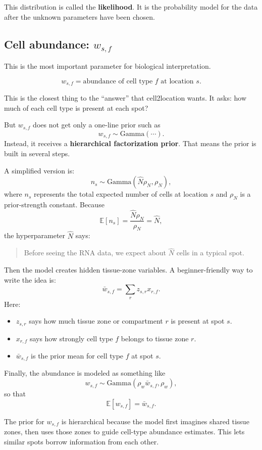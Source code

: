 \documentclass[11pt]{article}
\newcommand{\E}{\mathbb{E}}
\newcommand{\term}[1]{\textbf{#1}}
\begin{document}
This distribution is called the \term{likelihood}. It is the probability model for the data after the unknown parameters have been chosen.

\subsection{Cell abundance: $w_{s,f}$}

This is the most important parameter for biological interpretation.

\[
w_{s,f}=\text{abundance of cell type }f\text{ at location }s.
\]

This is the closest thing to the ``answer'' that cell2location wants. It asks: how much of each cell type is present at each spot?

But $w_{s,f}$ does not get only a one-line prior such as
\[
w_{s,f}\sim \mathrm{Gamma}(\cdots).
\]
Instead, it receives a \term{hierarchical factorization prior}. That means the prior is built in several steps.

A simplified version is:
\[
n_s\sim \mathrm{Gamma}(\hat N\rho_N,\rho_N),
\]
where $n_s$ represents the total expected number of cells at location $s$ and $\rho_N$ is a prior-strength constant. Because
\[
\E[n_s]=\frac{\hat N\rho_N}{\rho_N}=\hat N,
\]
the hyperparameter $\hat N$ says:

\begin{quote}
Before seeing the RNA data, we expect about $\hat N$ cells in a typical spot.
\end{quote}

Then the model creates hidden tissue-zone variables. A beginner-friendly way to write the idea is:
\[
\bar w_{s,f}=\sum_r z_{s,r}x_{r,f}.
\]
Here:
\begin{itemize}
  \item $z_{s,r}$ says how much tissue zone or compartment $r$ is present at spot $s$.
  \item $x_{r,f}$ says how strongly cell type $f$ belongs to tissue zone $r$.
  \item $\bar w_{s,f}$ is the prior mean for cell type $f$ at spot $s$.
\end{itemize}

Finally, the abundance is modeled as something like
\[
w_{s,f}\sim \mathrm{Gamma}\left(\rho_w\bar w_{s,f},\rho_w\right),
\]
so that
\[
\E[w_{s,f}]=\bar w_{s,f}.
\]

\begin{bigidea}
The prior for $w_{s,f}$ is hierarchical because the model first imagines shared tissue zones, then uses those zones to guide cell-type abundance estimates. This lets similar spots borrow information from each other.
\end{bigidea}
\end{document}
